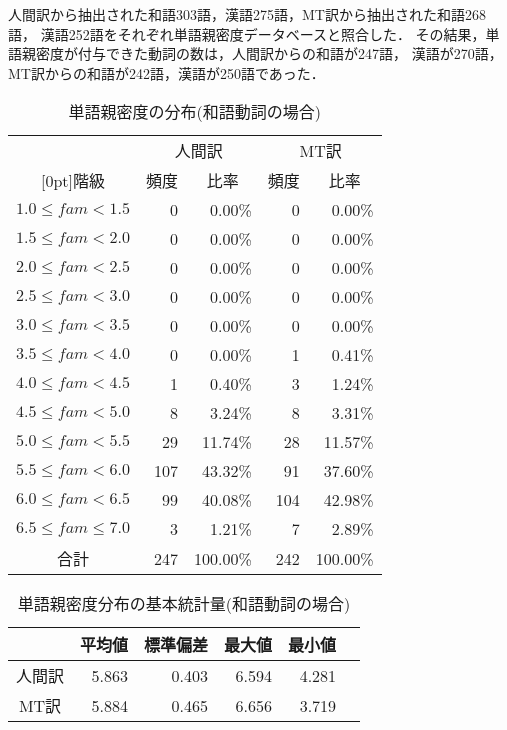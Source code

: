 人間訳から抽出された和語303語，漢語275語，MT訳から抽出された和語268語，
漢語252語をそれぞれ単語親密度データベースと照合した．
その結果，単語親密度が付与できた動詞の数は，人間訳からの和語が247語，
漢語が270語，MT訳からの和語が242語，漢語が250語であった．
\begin{table}[htbp]
\caption{単語親密度の分布(和語動詞の場合)} 
\label{tab:fam-histgram-wago-kotonari}
\begin{center}
\begin{tabular}{|c||r|r|r|r|}\hline
& \multicolumn{2}{c|}{人間訳} & \multicolumn{2}{c|}{MT訳} \\\cline{2-5}
\raisebox{1.5ex}[0pt]{階級} & \multicolumn{1}{c|}{頻度} & \multicolumn{1}{c|}{比率} & 
\multicolumn{1}{c|}{頻度} & \multicolumn{1}{c|}{比率} \\\hline \hline
$1.0 \le fam < 1.5$   &   0 &   0.00\% &   0 &   0.00\% \\
$1.5 \le fam < 2.0$   &   0 &   0.00\% &   0 &   0.00\% \\
$2.0 \le fam < 2.5$   &   0 &   0.00\% &   0 &   0.00\% \\
$2.5 \le fam < 3.0$   &   0 &   0.00\% &   0 &   0.00\% \\
$3.0 \le fam < 3.5$   &   0 &   0.00\% &   0 &   0.00\% \\
$3.5 \le fam < 4.0$   &   0 &   0.00\% &   1 &   0.41\% \\
$4.0 \le fam < 4.5$   &   1 &   0.40\% &   3 &   1.24\% \\
$4.5 \le fam < 5.0$   &   8 &   3.24\% &   8 &   3.31\% \\
$5.0 \le fam < 5.5$   &  29 &  11.74\% &  28 &  11.57\% \\
$5.5 \le fam < 6.0$   & 107 &  43.32\% &  91 &  37.60\% \\
$6.0 \le fam < 6.5$   &  99 &  40.08\% & 104 &  42.98\% \\
$6.5 \le fam \le 7.0$ &   3 &   1.21\% &   7 &   2.89\% \\\hline
合計                  & 247 & 100.00\% & 242 & 100.00\% \\\hline
\end{tabular}
\end{center}
\end{table}
\begin{table}[htbp]
\caption{単語親密度分布の基本統計量(和語動詞の場合)} 
\label{tab:stat-wago-kotonari}
\begin{center}
\begin{tabular}{|c||r|r|r|r|r|}\hline
 & \multicolumn{1}{c|}{平均値} &
\multicolumn{1}{c|}{標準偏差} & \multicolumn{1}{c|}{最大値} & 
\multicolumn{1}{c|}{最小値} \\\hline\hline
人間訳 & 5.863 & 0.403 & 6.594 & 4.281 \\
MT訳   & 5.884 & 0.465 & 6.656 & 3.719 \\\hline
\end{tabular}
\end{center}
\end{table}

